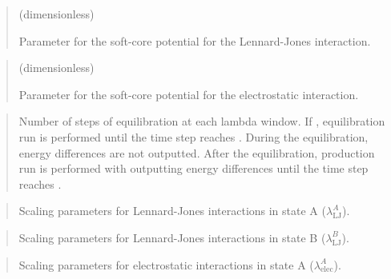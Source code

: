 \documentclass[a4paper,11pt,oneside,english]{sphinxmanual}
\begin{document}
 
\begin{quote}

 (dimensionless)

Parameter for the soft-core potential for the Lennard-Jones interaction.
\end{quote}

 
\begin{quote}

 (dimensionless)

Parameter for the soft-core potential for the electrostatic interaction.
\end{quote}

 
\begin{quote}


Number of steps of equilibration at each lambda window.
If , equilibration run is performed until the time step reaches .
During the equilibration, energy differences are not outputted.
After the equilibration, production run is performed with outputting energy differences until the time step reaches .
\end{quote}

 
\begin{quote}


Scaling parameters for Lennard-Jones interactions in state A (\(\lambda_{\text{LJ}}^A\)).
\end{quote}

 
\begin{quote}


Scaling parameters for Lennard-Jones interactions in state B (\(\lambda_{\text{LJ}}^B\)).
\end{quote}

 
\begin{quote}


Scaling parameters for electrostatic interactions in state A (\(\lambda_{\text{elec}}^A\)).
\end{quote}
\end{document}
